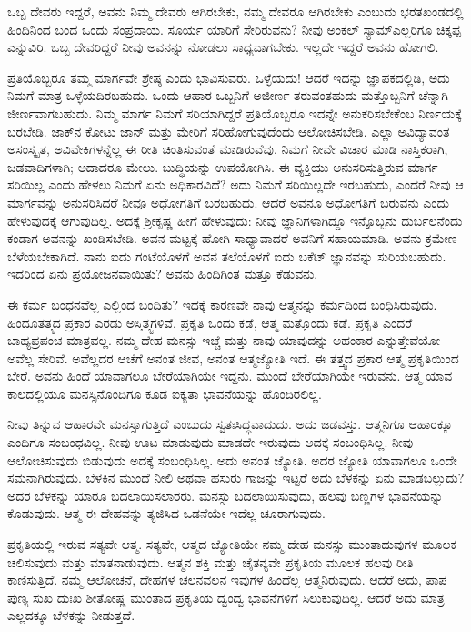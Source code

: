 ಒಬ್ಬ ದೇವರು ಇದ್ದರೆ, ಅವನು ನಿಮ್ಮ ದೇವರು ಆಗಿರಬೇಕು, ನಮ್ಮ ದೇವರೂ ಆಗಿರಬೇಕು ಎಂಬುದು ಭರತಖಂಡದಲ್ಲಿ ಹಿಂದಿನಿಂದ ಬಂದ ಒಂದು ಸಂಪ್ರದಾಯ. ಸೂರ್ಯ ಯಾರಿಗೆ ಸೇರಿರುವನು? ನೀವು ಅಂಕಲ್​ ಸ್ಯಾಮ್​ ಎಲ್ಲರಿಗೂ ಚಿಕ್ಕಪ್ಪ ಎನ್ನುವಿರಿ. ಒಬ್ಬ ದೇವರಿದ್ದರೆ ನೀವು ಅವನನ್ನು ನೋಡಲು ಸಾಧ್ಯವಾಗಬೇಕು. ಇಲ್ಲದೇ ಇದ್ದರೆ ಅವನು ಹೋಗಲಿ.

ಪ್ರತಿಯೊಬ್ಬರೂ ತಮ್ಮ ಮಾರ್ಗವೇ ಶ್ರೇಷ್ಠ ಎಂದು ಭಾವಿಸುವರು. ಒಳ್ಳೆಯದು! ಆದರೆ ಇದನ್ನು ಜ್ಞಾಪಕದಲ್ಲಿಡಿ, ಅದು ನಿಮಗೆ ಮಾತ್ರ ಒಳ್ಳೆಯದಿರಬಹುದು. ಒಂದು ಆಹಾರ ಒಬ್ಬನಿಗೆ ಅಜೀರ್ಣ ತರುವಂತಹುದು ಮತ್ತೊಬ್ಬನಿಗೆ ಚೆನ್ನಾಗಿ ಜೀರ್ಣವಾಗಬಹುದು. ನಿಮ್ಮ ಮಾರ್ಗ ನಿಮಗೆ ಸರಿಯಾಗಿದ್ದರೆ ಪ್ರತಿಯೊಬ್ಬರೂ ಇದನ್ನೇ ಅನುಕರಿಸಬೇಕೆಂಬ ನಿರ್ಣಯಕ್ಕೆ ಬರಬೇಡಿ. ಜಾಕ್​ನ ಕೋಟು ಜಾನ್​ ಮತ್ತು ಮೇರಿಗೆ ಸರಿಹೋಗುವುದೆಂದು ಆಲೋಚಿಸಬೇಡಿ. ಎಲ್ಲಾ ಅವಿದ್ಯಾವಂತ ಅಸಂಸ್ಕೃತ, ಅವಿವೇಕಿಗಳನ್ನೆಲ್ಲ ಈ ರೀತಿ ಚಿಂತಿಸುವಂತೆ ಮಾಡಿರುವೆವು. ನಿಮಗೆ ನೀವೇ ವಿಚಾರ ಮಾಡಿ ನಾಸ್ತಿಕರಾಗಿ, ಜಡವಾದಿಗಳಾಗಿ; ಅದಾದರೂ ಮೇಲು. ಬುದ್ಧಿಯನ್ನು ಉಪಯೋಗಿಸಿ. ಈ ವ್ಯಕ್ತಿಯು ಅನುಸರಿಸುತ್ತಿರುವ ಮಾರ್ಗ ಸರಿಯಿಲ್ಲ ಎಂದು ಹೇಳಲು ನಿಮಗೆ ಏನು ಅಧಿಕಾರವಿದೆ? ಅದು ನಿಮಗೆ ಸರಿಯಿಲ್ಲದೇ ಇರಬಹುದು, ಎಂದರೆ ನೀವು ಆ ಮಾರ್ಗವನ್ನು ಅನುಸರಿಸಿದರೆ ನೀವೂ ಅಧೋಗತಿಗೆ ಬರಬಹುದು. ಆದರೆ ಅವನೂ ಅಧೋಗತಿಗೆ ಬರುವನು ಎಂದು ಹೇಳುವುದಕ್ಕೆ ಆಗುವುದಿಲ್ಲ. ಅದಕ್ಕೆ ಶ‍್ರೀಕೃಷ್ಣ ಹೀಗೆ ಹೇಳುವುದು: ನೀವು ಜ್ಞಾನಿಗಳಾಗಿದ್ದೂ ಇನ್ನೊಬ್ಬನು ದುರ್ಬಲನೆಂದು ಕಂಡಾಗ ಅವನನ್ನು ಖಂಡಿಸಬೇಡಿ. ಅವನ ಮಟ್ಟಕ್ಕೆ ಹೋಗಿ ಸಾಧ್ಯಾವಾದರೆ ಅವನಿಗೆ ಸಹಾಯಮಾಡಿ. ಅವನು ಕ್ರಮೇಣ ಬೆಳೆಯಬೇಕಾಗಿದೆ. ನಾನು ಐದು ಗಂಟೆಯೊಳಗೆ ಅವನ ತಲೆಯೊಳಗೆ ಐದು ಬಕೆಟ್​ ಜ್ಞಾನವನ್ನು ಸುರಿಯಬಹುದು. ಇದರಿಂದ ಏನು ಪ್ರಯೋಜನವಾಯಿತು? ಅವನು ಹಿಂದಿಗಿಂತ ಮತ್ತೂ ಕೆಡುವನು.

ಈ ಕರ್ಮ ಬಂಧನವೆಲ್ಲ ಎಲ್ಲಿಂದ ಬಂದಿತು? ಇದಕ್ಕೆ ಕಾರಣವೇ ನಾವು ಆತ್ಮನನ್ನು ಕರ್ಮದಿಂದ ಬಂಧಿಸಿರುವುದು. ಹಿಂದೂತತ್ತ್ವದ ಪ್ರಕಾರ ಎರಡು ಅಸ್ತಿತ್ತ್ವಗಳಿವೆ. ಪ್ರಕೃತಿ ಒಂದು ಕಡೆ, ಆತ್ಮ ಮತ್ತೊಂದು ಕಡೆ. ಪ್ರಕೃತಿ ಎಂದರೆ ಬಾಹ್ಯಪ್ರಪಂಚ ಮಾತ್ರವಲ್ಲ. ನಮ್ಮ ದೇಹ ಮನಸ್ಸು ಇಚ್ಚೆ ಮತ್ತು ನಾವು ಯಾವುದನ್ನು ಅಹಂಕಾರ ಎನ್ನುತ್ತೇವೆಯೋ ಅವೆಲ್ಲ ಸೇರಿವೆ. ಅವೆಲ್ಲದರ ಆಚೆಗೆ ಅನಂತ ಜೀವ, ಅನಂತ ಆತ್ಮಜ್ಯೋತಿ ಇದೆ. ಈ ತತ್ತ್ವದ ಪ್ರಕಾರ ಆತ್ಮ ಪ್ರಕೃತಿಯಿಂದ ಬೇರೆ. ಅವನು ಹಿಂದೆ ಯಾವಾಗಲೂ ಬೇರೆಯಾಗಿಯೇ ಇದ್ದನು. ಮುಂದೆ ಬೇರೆಯಾಗಿಯೇ ಇರುವನು. ಆತ್ಮ ಯಾವ ಕಾಲದಲ್ಲಿಯೂ ಮನಸ್ಸಿನೊಂದಿಗೂ ಕೂಡ ಐಕ್ಯತಾ ಭಾವನೆಯನ್ನು ಹೊಂದಿರಲಿಲ್ಲ.

ನೀವು ತಿನ್ನುವ ಆಹಾರವೇ ಮನಸ್ಸಾಗುತ್ತಿದೆ ಎಂಬುದು ಸ್ವತಃಸಿದ್ಧವಾದುದು. ಅದು ಜಡವಸ್ತು. ಆತ್ಮನಿಗೂ ಆಹಾರಕ್ಕೂ ಎಂದಿಗೂ ಸಂಬಂಧವಿಲ್ಲ. ನೀವು ಊಟ ಮಾಡುವುದು ಮಾಡದೇ ಇರುವುದು ಅದಕ್ಕೆ ಸಂಬಂಧಿಸಿಲ್ಲ. ನೀವು ಆಲೋಚಿಸುವುದು ಬಿಡುವುದು ಅದಕ್ಕೆ ಸಂಬಂಧಿಸಿಲ್ಲ. ಅದು ಅನಂತ ಜ್ಯೋತಿ. ಅದರ ಜ್ಯೋತಿ ಯಾವಾಗಲೂ ಒಂದೇ ಸಮನಾಗಿರುವುದು. ಬೆಳಕಿನ ಮುಂದೆ ನೀಲಿ ಅಥವಾ ಹಸುರು ಗಾಜನ್ನು ಇಟ್ಟರೆ ಅದು ಬೆಳಕನ್ನು ಏನು ಮಾಡಬಲ್ಲುದು? ಅದರ ಬೆಳಕನ್ನು ಯಾರೂ ಬದಲಾಯಿಸಲಾರರು. ಮನಸ್ಸು ಬದಲಾಯಿಸುವುದು, ಹಲವು ಬಣ್ಣಗಳ ಭಾವನೆಯನ್ನು ಕೊಡುವುದು. ಆತ್ಮ ಈ ದೇಹವನ್ನು ತ್ಯಜಿಸಿದ ಒಡನೆಯೇ ಇದೆಲ್ಲ ಚೂರಾಗುವುದು.

ಪ್ರಕೃತಿಯಲ್ಲಿ ಇರುವ ಸತ್ಯವೇ ಆತ್ಮ. ಸತ್ಯವೇ, ಆತ್ಮದ ಜ್ಯೋತಿಯೇ ನಮ್ಮ ದೇಹ ಮನಸ್ಸು ಮುಂತಾದುವುಗಳ ಮೂಲಕ ಚಲಿಸುವುದು ಮತ್ತು ಮಾತನಾಡುವುದು. ಆತ್ಮನ ಶಕ್ತಿ ಮತ್ತು ಚೈತನ್ಯವೇ ಪ್ರಕೃತಿಯ ಮೂಲಕ ಹಲವು ರೀತಿ ಕಾಣಿಸುತ್ತಿದೆ. ನಮ್ಮ ಆಲೋಚನೆ, ದೇಹಗಳ ಚಲನವಲನ ಇವುಗಳ ಹಿಂದೆಲ್ಲ ಆತ್ಮನಿರುವುದು. ಆದರೆ ಅದು, ಪಾಪ ಪುಣ್ಯ ಸುಖ ದುಃಖ ಶೀತೋಷ್ಣ ಮುಂತಾದ ಪ್ರಕೃತಿಯ ದ್ವಂದ್ವ ಭಾವನೆಗಳಿಗೆ ಸಿಲುಕುವುದಿಲ್ಲ. ಆದರೆ ಅದು ಮಾತ್ರ ಎಲ್ಲದಕ್ಕೂ ಬೆಳಕನ್ನು ನೀಡುತ್ತದೆ.

